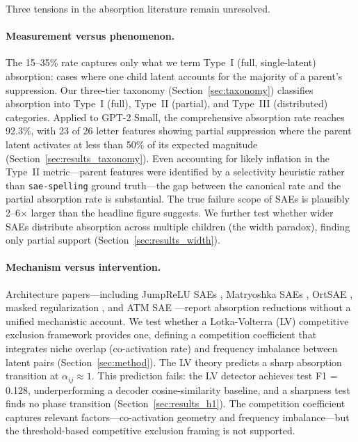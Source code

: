 \documentclass{article}
\begin{document}
Three tensions in the absorption literature remain unresolved.

\paragraph{Measurement versus phenomenon.} The 15--35\% rate captures only what we term Type~I (full, single-latent) absorption: cases where one child latent accounts for the majority of a parent's suppression. Our three-tier taxonomy (Section~\ref{sec:taxonomy}) classifies absorption into Type~I (full), Type~II (partial), and Type~III (distributed) categories. Applied to GPT-2 Small, the comprehensive absorption rate reaches 92.3\%, with 23 of 26 letter features showing partial suppression where the parent latent activates at less than 50\% of its expected magnitude (Section~\ref{sec:results_taxonomy}). Even accounting for likely inflation in the Type~II metric---parent features were identified by a selectivity heuristic rather than \texttt{sae-spelling} ground truth---the gap between the canonical rate and the partial absorption rate is substantial. The true failure scope of SAEs is plausibly 2--6$\times$ larger than the headline figure suggests. We further test whether wider SAEs distribute absorption across multiple children (the width paradox), finding only partial support (Section~\ref{sec:results_width}).

\paragraph{Mechanism versus intervention.} Architecture papers---including JumpReLU SAEs \citep{rajamanoharan2024jumprelu}, Matryoshka SAEs \citep{bussmann2025matryoshka}, OrtSAE \citep{bussmann2025ortsae}, masked regularization \citep{narayanaswamy2025masked}, and ATM SAE \citep{li2025atm}---report absorption reductions without a unified mechanistic account. We test whether a Lotka-Volterra (LV) competitive exclusion framework provides one, defining a competition coefficient that integrates niche overlap (co-activation rate) and frequency imbalance between latent pairs (Section~\ref{sec:method}). The LV theory predicts a sharp absorption transition at $\alpha_{ij} \approx 1$. This prediction fails: the LV detector achieves test F1 = 0.128, underperforming a decoder cosine-similarity baseline, and a sharpness test finds no phase transition (Section~\ref{sec:results_h1}). The competition coefficient captures relevant factors---co-activation geometry and frequency imbalance---but the threshold-based competitive exclusion framing is not supported.
\end{document}
